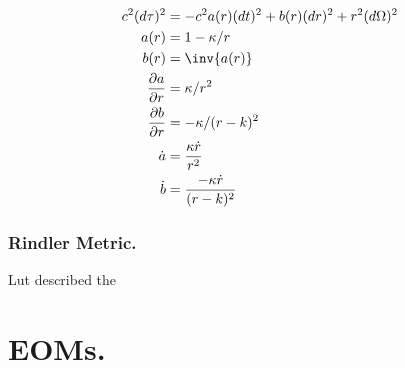 \documentclass{article}      %
\newcommand{\PD}[2]{\frac{\partial {#2}}{\partial {#1}}}
\newcommand{\CC}[0]{c^2}
\newcommand{\adot}[0]{\dot{a}}
\newcommand{\bdot}[0]{\dot{b}}
\newcommand{\rdot}[0]{\dot{r}}
\begin{document}
\begin{align}
\CC (d\tau)^2 &= -\CC a(r) (dt)^2 + {b(r)} (dr)^2 + r^2(d\Omega)^2 \\
a(r) &= 1 - \kappa/r \\
b(r) &= \inv{a(r)} \\
\PD{r}{a} &= \kappa/r^2 \\
\PD{r}{b} &= -\kappa/(r-k)^2 \\
\adot &= \frac{\kappa \rdot}{r^2} \\
\bdot &= \frac{-\kappa \rdot}{(r-k)^2}
\end{align}

\subsubsection{ Rindler Metric. }

Lut described the 

\section{ EOMs. }

%
\end{document}
